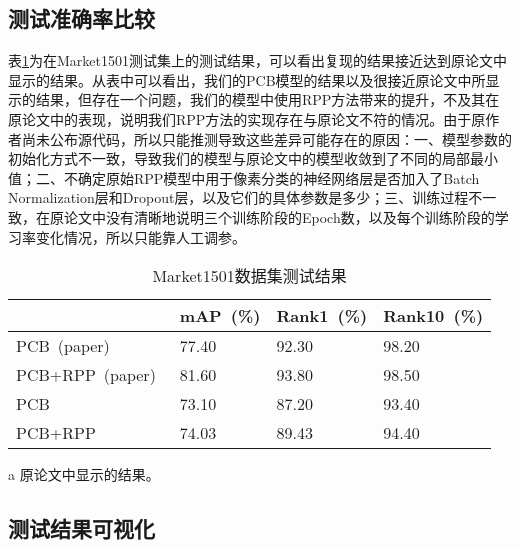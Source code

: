 \subsection{测试准确率比较}

表\ref{tab:test}为在Market1501测试集上的测试结果，可以看出复现的结果接近达到原论文\cite{sun2017beyond}中显示的结果。从表中可以看出，我们的PCB模型的结果以及很接近原论文中所显示的结果，但存在一个问题，我们的模型中使用RPP方法带来的提升，不及其在原论文中的表现，说明我们RPP方法的实现存在与原论文不符的情况。由于原作者尚未公布源代码，所以只能推测导致这些差异可能存在的原因：一、模型参数的初始化方式不一致，导致我们的模型与原论文中的模型收敛到了不同的局部最小值；二、不确定原始RPP模型中用于像素分类的神经网络层是否加入了Batch Normalization\cite{ioffe2015batch}层和Dropout\cite{srivastava2014dropout}层，以及它们的具体参数是多少；三、训练过程不一致，在原论文中没有清晰地说明三个训练阶段的Epoch数，以及每个训练阶段的学习率变化情况，所以只能靠人工调参。

\begin{table}[!ht]
    \centering
    \caption{Market1501数据集测试结果}
    \label{tab:test}
    \begin{threeparttable}
    \begin{tabularx}{\textwidth}{p{}p{}<{\centering}p{}<{\centering}p{}<{\centering}}
    \toprule
                            & mAP~(\%)   & Rank1~(\%) & Rank10~(\%) \\ \midrule
    PCB~(paper)~\tnote{a}    & 77.40  & 92.30  & 98.20   \\
    PCB+RPP~(paper)~\tnote{a}& 81.60  & 93.80  & 98.50   \\
    PCB                      & 73.10  & 87.20  & 93.40   \\
    PCB+RPP                  & 74.03  & 89.43  & 94.40   \\ \bottomrule
    \end{tabularx}
    \begin{tablenotes}
        \footnotesize
        \item[a] 原论文\cite{sun2017beyond}中显示的结果。
    \end{tablenotes}
    \end{threeparttable}

\end{table}

\subsection{测试结果可视化}

